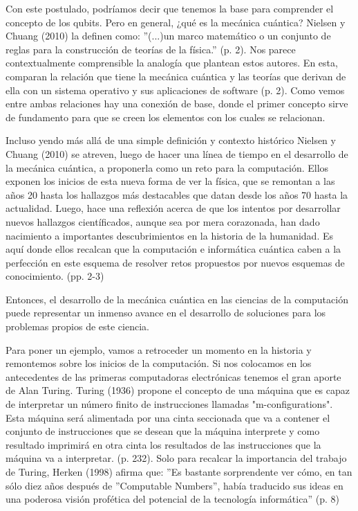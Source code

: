 \documentclass[11pt,a4paper]{article}
\begin{document}
Con este postulado, podríamos decir que tenemos la base para comprender el concepto de los qubits. Pero en general, ¿qué es la mecánica cuántica? Nielsen y Chuang (2010) la definen como: ''(...)un marco matemático o un conjunto de reglas para la construcción de teorías de la física.'' (p. 2). Nos parece contextualmente comprensible la analogía que plantean estos autores. En esta, comparan la relación que tiene la mecánica cuántica y las teorías que derivan de ella con un sistema operativo y sus aplicaciones de software (p. 2). Como vemos entre ambas relaciones hay una conexión de base, donde el primer concepto sirve de fundamento para que se creen los elementos con los cuales se relacionan.

Incluso yendo más allá de una simple definición y contexto histórico Nielsen y Chuang (2010) se atreven, luego de hacer una línea de tiempo en el desarrollo de la mecánica cuántica, a proponerla como un reto para la computación. Ellos exponen los inicios de esta nueva forma de ver la física, que se remontan a las años 20 hasta los hallazgos más destacables que datan desde los años 70 hasta la actualidad. Luego, hace una reflexión acerca de que los intentos por desarrollar nuevos hallazgos científicados, aunque sea por mera corazonada, han dado nacimiento a importantes descubrimientos en la historia de la humanidad. Es aquí donde ellos recalcan que la computación e informática cuántica caben a la perfección en este esquema de resolver retos propuestos por nuevos esquemas de conocimiento. (pp. 2-3)

Entonces, el desarrollo de la mecánica cuántica en las ciencias de la computación puede representar un inmenso avance en el desarrollo de soluciones para los problemas propios de este ciencia. 

Para poner un ejemplo, vamos a retroceder un momento en la historia y remontemos sobre los inicios de la computación. Si nos colocamos en los antecedentes de las primeras computadoras electrónicas tenemos el gran aporte de Alan Turing. Turing (1936) propone el concepto de una máquina que es capaz de interpretar un número finito de instrucciones llamadas "m-configurations". Esta máquina será alimentada por una cinta seccionada que va a contener el conjunto de instrucciones que se desean que la máquina interprete y como resultado imprimirá en otra cinta los resultados de las instrucciones que la máquina va a interpretar. (p. 232). Solo para recalcar la importancia del trabajo de Turing, Herken (1998) afirma que: ''Es bastante sorprendente ver cómo, en tan sólo diez años después de ''Computable Numbers'', había traducido sus ideas en una poderosa visión profética del potencial de la tecnología informática'' (p. 8) 
\end{document}
